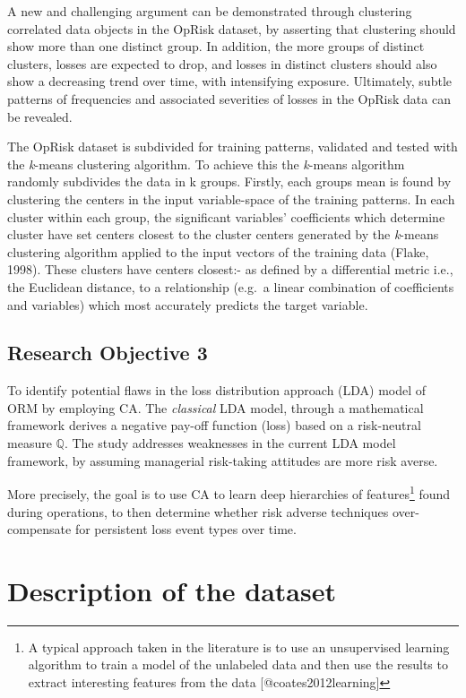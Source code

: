 \documentclass{DissertateUSU}
\begin{document}
A new and challenging argument can be demonstrated through clustering
correlated data objects in the OpRisk dataset, by asserting that
clustering should show more than one distinct group. In addition, the
more groups of distinct clusters, losses are expected to drop, and
losses in distinct clusters should also show a decreasing trend over
time, with intensifying exposure. Ultimately, subtle patterns of
frequencies and associated severities of losses in the OpRisk data can
be revealed.\medskip  

The OpRisk dataset is subdivided for training patterns, validated and
tested with the \emph{k}-means clustering algorithm. To achieve this the
\emph{k}-means algorithm randomly subdivides the data in k groups.
Firstly, each groups mean is found by clustering the centers in the
input variable-space of the training patterns. In each cluster within
each group, the significant variables' coefficients which determine
cluster have set centers closest to the cluster centers generated by the
\emph{k}-means clustering algorithm applied to the input vectors of the
training data (Flake, 1998). These clusters have centers closest:- as
defined by a differential metric i.e., the Euclidean distance, to a
relationship (e.g.~a linear combination of coefficients and variables)
which most accurately predicts the target variable.

\subsection{Research Objective 3}

To identify potential flaws in the loss distribution approach (LDA)
model of ORM by employing CA. The \textit{classical} LDA model, through
a mathematical framework derives a negative pay-off function (loss)
based on a risk-neutral measure \(\mathbb{Q}\). The study addresses
weaknesses in the current LDA model framework, by assuming managerial
risk-taking attitudes are more risk averse.\medskip

More precisely, the goal is to use CA to learn deep hierarchies of
features\footnote{A typical approach taken in the literature is to use an unsupervised learning algorithm to train a model of the unlabeled data and then use the results to extract interesting features from the data [@coates2012learning]}
found during operations, to then determine whether risk adverse
techniques over-compensate for persistent loss event types over time.

\section{Description of the dataset}
\end{document}
